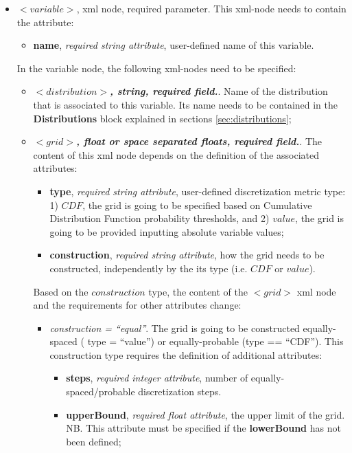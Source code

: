 \begin{itemize}
\item $<variable>$, xml node, required parameter. This xml-node needs to contain the attribute:
\begin{itemize}
  \item \textbf{name}, \textit{required string attribute}, user-defined name of this variable. 
 \end{itemize}
 In the variable node, the following xml-nodes need to be specified:
 \begin{itemize}
    \item $<distribution>$\textbf{\textit{, string, required field.}}. Name of the distribution that is associated to this variable. Its name needs to be contained in the \textbf{Distributions} block explained in sections \ref{sec:distributions};
    \item $<grid>$\textbf{\textit{, float or space separated floats, required field.}}. The content of this xml node depends on the definition of the associated attributes:
\begin{itemize}
\itemsep0em
\item \textbf{type}, \textit{required string attribute}, user-defined discretization metric type: 1) $CDF$, the grid is going to be specified based on  Cumulative Distribution Function probability thresholds, and 2) $value$, the grid is going to be provided inputting absolute variable values;
\item \textbf{construction}, \textit{required string attribute}, how the grid needs to be constructed, independently by the its type (i.e. $CDF$ or $value$). 
\end{itemize}
Based on the $construction$ type, the content of the $<grid>$ xml node and the requirements for other attributes change:
\begin{itemize}
  \item \textit{construction = ``equal''}. The grid is going to be constructed equally-spaced ( type = ``value'') or equally-probable (type == ``CDF''). This construction type requires the definition of additional attributes:
      \begin{itemize}
         \item \textbf{steps}, \textit{required integer attribute}, number of equally-spaced/probable discretization steps.
         \item \textbf{upperBound}, \textit{required float attribute}, the upper limit of the grid. 
        NB. This attribute must be specified if the \textbf{lowerBound} has not been defined;

\end{itemize}
\end{itemize}
\end{itemize}
\end{itemize}
